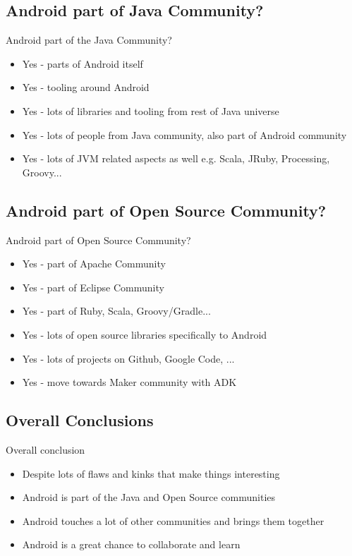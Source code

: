 \documentclass[aspectratio=169]{beamer}
\begin{document}
  \subsection{Android part of Java Community?}
    \begin{frame}{Android part of the Java Community?}
     \begin{itemize}
      \item<1-> Yes - parts of Android itself
      \item<2-> Yes - tooling around Android
      \item<3-> Yes - lots of libraries and tooling from rest of Java universe
      \item<4-> Yes - lots of people from Java community, also part of Android community
      \item<5-> Yes - lots of JVM related aspects as well e.g. Scala, JRuby, Processing, Groovy...
      \end{itemize}
    \end{frame}
  
  \subsection{Android part of Open Source Community?}
    \begin{frame}{Android part of Open Source Community?}
     \begin{itemize}
      \item<1-> Yes - part of Apache Community
      \item<2-> Yes - part of Eclipse Community
      \item<3-> Yes - part of Ruby, Scala, Groovy/Gradle...
      \item<4-> Yes - lots of open source libraries specifically to Android
      \item<5-> Yes - lots of projects on Github, Google Code, ...
      \item<6-> Yes - move towards Maker community with ADK
     \end{itemize}
    \end{frame}

  \subsection{Overall Conclusions}
    \begin{frame}{Overall conclusion}
      \begin{itemize}
        \item<1-> Despite lots of flaws and kinks that make things interesting
        \item<2-> Android is part of the Java and Open Source communities
        \item<3-> Android touches a lot of other communities and brings them together
        \item<4-> Android is a great chance to collaborate and learn
      \end{itemize}
    \end{frame}
\end{document}
